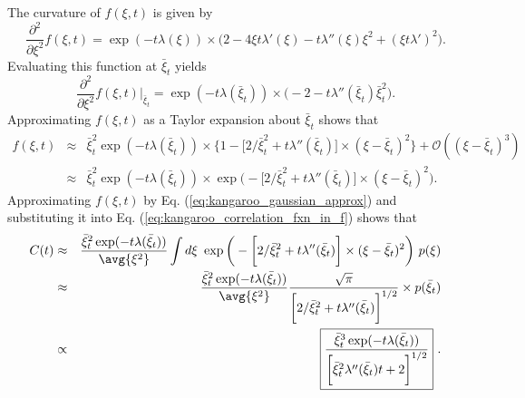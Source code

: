 The curvature of $f(\xi, t)$ is given by
\begin{equation}
\frac{\partial^2}{\partial \xi^2} f(\xi, t) = \exp(-t \lambda(\xi)) \times \bigg( 2 - 4 \xi  t \lambda'(\xi)  - t  \lambda''(\xi) \xi^2  + (\xi  t \lambda')^2 \bigg). \nonumber
\end{equation}
Evaluating this function at $\bar{\xi}_t$ yields
\begin{equation}
\frac{\partial^2}{\partial \xi^2} f(\xi, t) \bigg|_{\bar{\xi}_t} =  \exp(- t \lambda(\bar{\xi}_t)) \times \bigg(-2 -  t \lambda''(\bar{\xi}_t) \bar{\xi}_t^2\bigg). \nonumber
\end{equation}
Approximating $f(\xi, t)$ as a Taylor expansion about $\bar{\xi}_t$ shows that
\begin{eqnarray}
f(\xi, t)  &\approx &  \bar{\xi}_t^2 \exp(- t \lambda(\bar{\xi}_t)) \times \bigg\{1 -\bigg[2/\bar{\xi}_t^2 +  t \lambda''(\bar{\xi}_t)\bigg] \times (\xi - \bar{\xi}_t)^2  \bigg\} + \mathcal{O}((\xi - \bar{\xi}_t)^3) \nonumber \\
&\approx & \bar{\xi}_t^2 \exp(- t \lambda(\bar{\xi}_t)) \times \exp\bigg(-\bigg[2/\bar{\xi}_t^2 +  t \lambda''(\bar{\xi}_t)\bigg] \times (\xi - \bar{\xi}_t)^2\bigg). \label{eq:kangaroo_gaussian_approx}
\end{eqnarray}
Approximating $f(\xi, t)$ by Eq. (\ref{eq:kangaroo_gaussian_approx}) and substituting it into Eq. (\ref{eq:kangaroo_correlation_fxn_in_f}) shows that
\begin{eqnarray}
C(t) &\approx& \frac{\bar{\xi}_t^2 \exp(-t \lambda(\bar{\xi}_t))}{\avg{\xi^2}} \int d \xi~  \exp\bigg(-\bigg[2/\bar{\xi}_t^2 +  t \lambda''(\bar{\xi}_t)\bigg] \times (\xi - \bar{\xi}_t)^2\bigg) ~p(\xi) \nonumber  \\
&\approx&  \frac{\bar{\xi}_t^2 \exp(- t \lambda(\bar{\xi}_t))}{\avg{\xi^2}} \frac{\sqrt{\pi}}{\bigg[2/\bar{\xi}_t^2+  t \lambda''(\bar{\xi}_t) \bigg]^{1/2}} \times p(\bar{\xi}_t) \nonumber \\
&\propto& \boxed{ \frac{\bar{\xi}_t^3 \exp(- t \lambda(\bar{\xi}_t))}{\bigg[\bar{\xi}_t^2  \lambda''(\bar{\xi}_t)  t + 2 \bigg]^{1/2}} }~.
\end{eqnarray}
